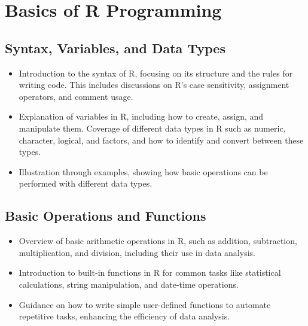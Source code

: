 \documentclass[
]{book}
\begin{document}
\hypertarget{basics-of-r-programming}{%
\section*{Basics of R Programming}\label{basics-of-r-programming}}

\hypertarget{syntax-variables-and-data-types}{%
\subsection*{Syntax, Variables, and Data Types}\label{syntax-variables-and-data-types}}

\begin{itemize}
\item
  Introduction to the syntax of R, focusing on its structure and the rules for writing code. This includes discussions on R's case sensitivity, assignment operators, and comment usage.
\item
  Explanation of variables in R, including how to create, assign, and manipulate them. Coverage of different data types in R such as numeric, character, logical, and factors, and how to identify and convert between these types.
\item
  Illustration through examples, showing how basic operations can be performed with different data types.
\end{itemize}

\hypertarget{basic-operations-and-functions}{%
\subsection*{Basic Operations and Functions}\label{basic-operations-and-functions}}

\begin{itemize}
\item
  Overview of basic arithmetic operations in R, such as addition, subtraction, multiplication, and division, including their use in data analysis.
\item
  Introduction to built-in functions in R for common tasks like statistical calculations, string manipulation, and date-time operations.
\item
  Guidance on how to write simple user-defined functions to automate repetitive tasks, enhancing the efficiency of data analysis.
\end{itemize}
\end{document}
